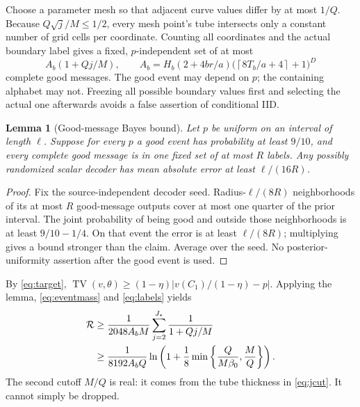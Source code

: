 \documentclass[11pt,letterpaper]{article}
\newtheorem{lemma}[theorem]{Lemma}
\theoremstyle{definition}\newtheorem{definition}[theorem]{Definition}
\theoremstyle{remark}\newtheorem{remark}[theorem]{Remark}
\newcommand{\TV}{\operatorname{TV}}
\newcommand{\ceil}[1]{\left\lceil #1\right\rceil}
\newcommand{\betaz}{\beta_0}
\newcommand{\Risk}{\mathcal{R}}
\begin{document}
Choose a parameter mesh so that adjacent curve values differ by at most $1/Q$. Because $Q\sqrt j/M\le1/2$, every mesh point's tube intersects only a constant number of grid cells per coordinate. Counting all coordinates and the actual boundary label gives a fixed, $p$-independent set of at most
\begin{equation}\label{eq:labels}
 A_b(1+Qj/M),\qquad
 A_b=H_b(2+4br/a)\bigl(\ceil{8T_b/a+4}+1\bigr)^D
\end{equation}
complete good messages. The good event may depend on $p$; the containing alphabet may not. Freezing all possible boundary values first and selecting the actual one afterwards avoids a false assertion of conditional IID.

\begin{lemma}[Good-message Bayes bound]\label{lem:messages}
Let $p$ be uniform on an interval of length $\ell$. Suppose for every $p$ a good event has probability at least $9/10$, and every complete good message is in one fixed set of at most $R$ labels. Any possibly randomized scalar decoder has mean absolute error at least $\ell/(16R)$.
\end{lemma}
\begin{proof}
Fix the source-independent decoder seed. Radius-$\ell/(8R)$ neighborhoods of its at most $R$ good-message outputs cover at most one quarter of the prior interval. The joint probability of being good and outside those neighborhoods is at least $9/10-1/4$. On that event the error is at least $\ell/(8R)$; multiplying gives a bound stronger than the claim. Average over the seed. No posterior-uniformity assertion after the good event is used.
\end{proof}

By \eqref{eq:target}, $\TV(v,\theta)\ge(1-\eta)|v(C_1)/(1-\eta)-p|$. Applying the lemma, \eqref{eq:eventmass} and \eqref{eq:labels} yields
\begin{align}\label{eq:harmonic}
 \Risk&\ge\frac1{2048A_bM}\sum_{j=2}^{J_*}\frac1{1+Qj/M}\notag\\
 &\ge\frac1{8192A_bQ}\ln\left(1+\frac18\min\left\{\frac{Q}{M\betaz},\frac M Q\right\}\right).
\end{align}
The second cutoff $M/Q$ is real: it comes from the tube thickness in \eqref{eq:jcut}. It cannot simply be dropped.
\end{document}
